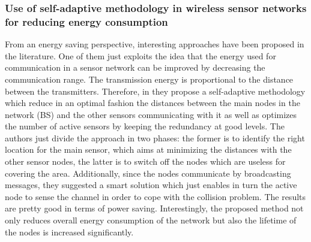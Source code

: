 \subsubsection*{Use of self-adaptive methodology in wireless sensor networks for
reducing energy consumption}
From an energy saving perspective, interesting approaches have been proposed in
the literature. One of them just exploits the idea that the energy used for
communication in a sensor network can be improved by decreasing the
communication range. The transmission energy is proportional to the distance
between the transmitters. Therefore, in \cite{reduceEnergy} they propose a
self-adaptive methodology which reduce in an optimal fashion the distances
between the main nodes in the network (BS) and the other sensors communicating
with it as well as optimizes the number of active sensors by keeping the
redundancy at good levels.  The authors just divide the approach in two phases:
the former is to identify the right location for the main sensor, which aims at
minimizing the distances with the other sensor nodes, the latter is to switch
off the nodes which are useless for covering the area. Additionally, since the
nodes communicate by broadcasting messages, they suggested a smart solution
which just enables in turn the active node to sense the channel in order to cope
with the collision problem. The results are pretty good in terms of power
saving. Interestingly, the proposed method not only reduces overall energy
consumption of the network but also the lifetime of the nodes is increased
significantly.
